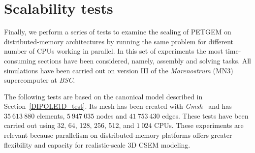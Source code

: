 \documentclass[review]{elsarticle}
\begin{document}
\section{Scalability tests}
\label{Scalability tests}
Finally, we perform a series of tests to examine the scaling of PETGEM on distributed-memory architectures by running the same problem for different number of CPUs working in parallel. In this set of experiments the most time-consuming sections have been considered, namely, assembly and solving tasks. All simulations have been carried out on version III of the \textit{Marenostrum} (MN3) supercomputer at \textit{BSC}.

The following tests are based on the canonical model described in Section~\ref{DIPOLE1D_test}. Its mesh has been created with \textit{Gmsh}~\citep{Geuzaine2008} and has $35\:613\:880$ elements, $5\:947\:035$ nodes and $41\:753\:430$ edges. These tests have been carried out using 32, 64, 128, 256, 512, and $1\:024$ CPUs. These experiments are relevant because parallelism on distributed-memory platforms offers greater flexibility and capacity for realistic-scale 3D CSEM modeling.
\end{document}
